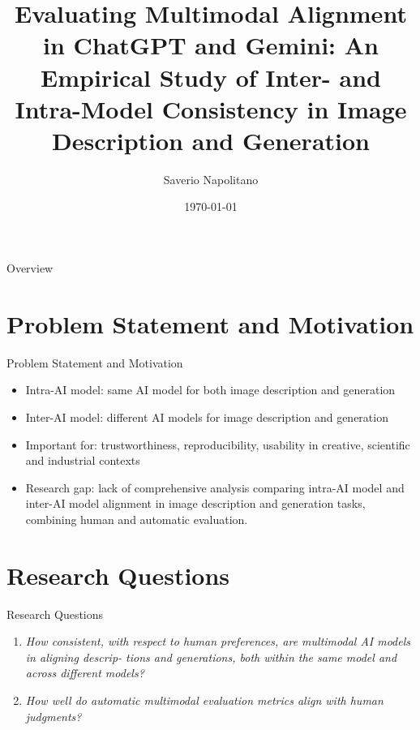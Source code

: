 \documentclass[aspectratio=169,xcolor=dvipsnames]{beamer}
\title{Evaluating Multimodal Alignment in ChatGPT and
Gemini: An Empirical Study of Inter- and
Intra-Model Consistency in Image Description and
Generation}
\author{Saverio Napolitano}
\institute
{
    Mid Sweden University %
}
\date{\today} %
\begin{document}
\begin{frame}
    \titlepage
\end{frame}

\begin{frame}{Overview}
    \tableofcontents
\end{frame}

\section{Problem Statement and Motivation}

\begin{frame}{Problem Statement and Motivation}
    \begin{itemize}
        \item Intra-AI model: same AI model for both image description and generation
        \item Inter-AI model: different AI models for image description and generation
        \item Important for: trustworthiness, reproducibility, usability in creative, scientific and industrial contexts
        \item Research gap: lack of comprehensive analysis comparing intra-AI model and inter-AI model alignment in image description and generation tasks, combining human and automatic evaluation.
    \end{itemize}
\end{frame}

\section{Research Questions}

\begin{frame}{Research Questions}
    \begin{enumerate}
        \item \emph{How consistent, with respect to human preferences, are multimodal AI models in aligning descrip-
tions and generations, both within the same model and across different models?}
        \item \emph{How well do automatic multimodal evaluation metrics align with human judgments?} 
    \end{enumerate}
\end{frame}
\end{document}
